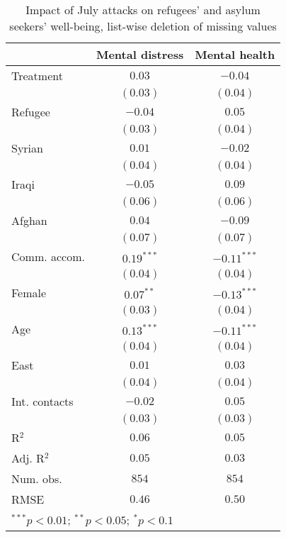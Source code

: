 
\begin{table}
\caption{Impact of July attacks on refugees' and asylum seekers' well-being, list-wise deletion of missing values}
\begin{center}
\begin{tabular}{l c c}
\toprule
 & Mental distress & Mental health \\
\midrule
Treatment     & $0.03$       & $-0.04$       \\
              & $(0.03)$     & $(0.04)$      \\
Refugee       & $-0.04$      & $0.05$        \\
              & $(0.03)$     & $(0.04)$      \\
Syrian        & $0.01$       & $-0.02$       \\
              & $(0.04)$     & $(0.04)$      \\
Iraqi         & $-0.05$      & $0.09$        \\
              & $(0.06)$     & $(0.06)$      \\
Afghan        & $0.04$       & $-0.09$       \\
              & $(0.07)$     & $(0.07)$      \\
Comm. accom.  & $0.19^{***}$ & $-0.11^{***}$ \\
              & $(0.04)$     & $(0.04)$      \\
Female        & $0.07^{**}$  & $-0.13^{***}$ \\
              & $(0.03)$     & $(0.04)$      \\
Age           & $0.13^{***}$ & $-0.11^{***}$ \\
              & $(0.04)$     & $(0.04)$      \\
East          & $0.01$       & $0.03$        \\
              & $(0.04)$     & $(0.04)$      \\
Int. contacts & $-0.02$      & $0.05$        \\
              & $(0.03)$     & $(0.03)$      \\
\midrule
R$^2$         & $0.06$       & $0.05$        \\
Adj. R$^2$    & $0.05$       & $0.03$        \\
Num. obs.     & $854$        & $854$         \\
RMSE          & $0.46$       & $0.50$        \\
\bottomrule
\multicolumn{3}{l}{\scriptsize{$^{***}p<0.01$; $^{**}p<0.05$; $^{*}p<0.1$}}
\end{tabular}
\label{tab_mhealth_na}
\end{center}
\end{table}
